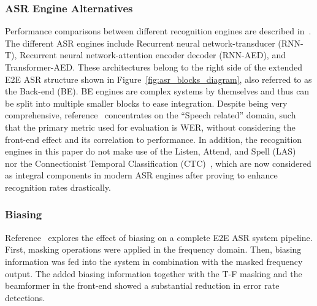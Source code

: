 \subsubsection{ASR Engine Alternatives}
Performance comparisons between different recognition
engines are described in~\cite{900384911}. 
The different ASR engines include 
Recurrent neural network-transducer (RNN-T), 
Recurrent neural network-attention encoder decoder (RNN-AED),
and Transformer-AED.
These architectures belong to the right side
of the extended E2E ASR structure shown in 
Figure~\ref{fig:asr_blocks_diagram}, 
also referred to as the
Back-end (BE).
BE engines are complex systems by themselves
and thus can be split into multiple smaller
blocks to ease integration.
Despite being very comprehensive, reference~\cite{900384911} 
concentrates on
the ``Speech related'' domain,
such that the primary metric used for evaluation is WER,
without considering the front-end
effect and its correlation to performance.
In addition, the recognition engines in this paper
do not make use of the 
Listen, Attend, and Spell (LAS)~\cite{7472621}
nor the Connectionist Temporal 
Classification (CTC)~\cite{hannun2017sequence},
which are now considered as integral components in modern 
ASR engines after proving to enhance recognition rates drastically. 


\subsubsection{Biasing}
Reference~\cite{20202222222} explores the effect of biasing
on a complete E2E ASR system pipeline. 
First, masking operations were
applied in the frequency domain.
Then, biasing information was fed
into the system in combination with the 
masked frequency output. 
The added biasing information
together with the T-F masking and the beamformer
in the front-end showed a substantial reduction
in error rate detections.

